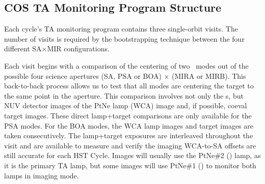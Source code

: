 \subsection{COS TA Monitoring Program Structure}\label{subsec:structure}

Each cycle's TA monitoring program contains three single-orbit visits. The number of visits is required by the bootstrapping technique between the four different  SA$\times$MIR configurations.

Each visit begins with a comparison of the centering of two ~modes out of the possible four science apertures (SA, PSA or BOA) $\times$ (MIRA or MIRB).
This back-to-back process allows us to test that all  modes are centering the target to the same point in the aperture.
This comparison involves not only the s, but NUV detector images of the PtNe lamp (WCA) image and, if possible, coeval target images.
These direct lamp+target comparisons are only available for the PSA modes. For the BOA modes, the WCA lamp images and target images are taken consecutively.
The lamp+target exposures are interleaved throughout the visit and are available to measure and verify the imaging WCA-to-SA offsets are still accurate for each HST Cycle.
Images will usually use the PtNe\#2 (\plamptwo{}) lamp, as it is the primary TA lamp, but some images will use PtNe\#1 (\plampone{}) to monitor both lamps in imaging mode.

